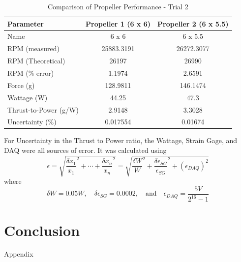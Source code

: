 \documentclass{article}
\begin{document}
  
\begin{table}[H]
  \centering
  \begin{tabular}{lcc}
  \hline
  \textbf{Parameter} & \textbf{Propeller 1 (6 x 6)} & \textbf{Propeller 2 (6 x 5.5)} \\
  \hline
  Name & 6 x 6 & 6 x 5.5 \\
  RPM (measured) & 25883.3191 & 26272.3077 \\
  RPM (Theoretical) & 26197 & 26990 \\
  RPM (\% error) & 1.1974 & 2.6591 \\
  Force (g) & 128.9811 & 146.1474 \\
  Wattage (W) & 44.25 & 47.3 \\
  Thrust-to-Power (g/W) & 2.9148 & 3.3028 \\
  Uncertainty (\%) & 0.017554 & 0.01674 \\
  \hline
  \end{tabular}
  \caption{Comparison of Propeller Performance - Trial 2}
  \label{table:propeller_performance2}
  \end{table}
  
  For Uncertainty in the Thrust to Power ratio, the Wattage, Strain Gage, and DAQ were all sources of error. It was calculated using \begin{equation}
    \epsilon = \sqrt{ \frac{\delta x_1}{x_1}^2 + \cdots + \frac{\delta x_n}{x_n}^2} = \sqrt{ \frac{\delta W}{W}^2 + \frac{\delta \epsilon_{SG}}{\epsilon_{SG}}^2 + (\epsilon_{DAQ})^2}
   \end{equation}
   where \begin{equation}
    \delta W = 0.05 W, \quad \delta \epsilon_{SG} = 0.0002, \quad \text{and} \quad \epsilon_{DAQ} = \frac{5V}{2^{16}-1} 
  \end{equation} 

\section{Conclusion}


\newpage
\thispagestyle{empty}  %
\begin{center}
	\vspace*{\fill}
	{\Huge Appendix}
	\vspace*{\fill}
\end{center}
\end{document}
